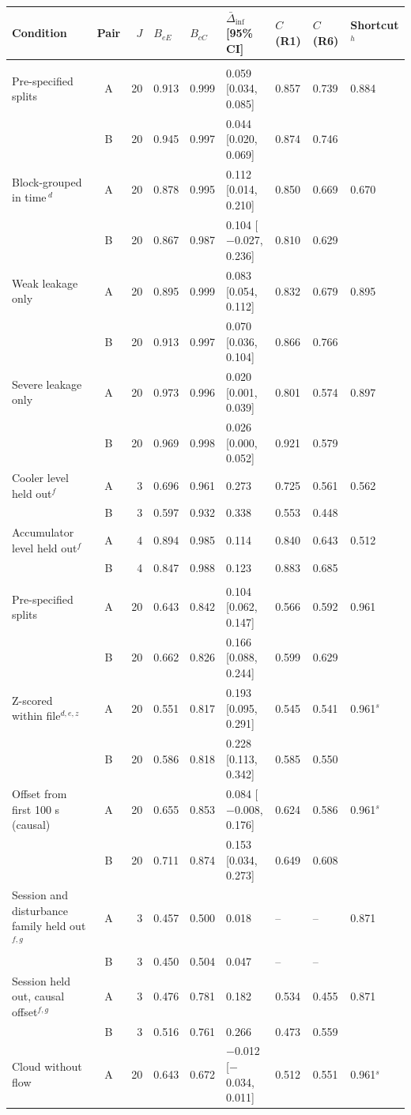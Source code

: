 \begin{tabular}{@{}>{\raggedright\arraybackslash}p{2.9cm} c r lll ll l@{}}
\toprule
Condition & Pair & $J$ & $B_{eE}$ & $B_{cC}$ & $\bar\Delta_{\mathrm{inf}}$ [95\% CI] & $C$(R1) & $C$(R6) & Shortcut$^{h}$ \\
\midrule
\multicolumn{9}{@{}l}{\textit{Hydraulic}} \\
Pre-specified splits & A & 20 & 0.913 & 0.999 & 0.059 [0.034, 0.085] & 0.857 & 0.739 & 0.884 \\
 & B & 20 & 0.945 & 0.997 & 0.044 [0.020, 0.069] & 0.874 & 0.746 &  \\
Block-grouped in time\,$^{d}$ & A & 20 & 0.878 & 0.995 & 0.112 [0.014, 0.210] & 0.850 & 0.669 & 0.670 \\
 & B & 20 & 0.867 & 0.987 & 0.104 [$-$0.027, 0.236] & 0.810 & 0.629 &  \\
Weak leakage only & A & 20 & 0.895 & 0.999 & 0.083 [0.054, 0.112] & 0.832 & 0.679 & 0.895 \\
 & B & 20 & 0.913 & 0.997 & 0.070 [0.036, 0.104] & 0.866 & 0.766 &  \\
Severe leakage only & A & 20 & 0.973 & 0.996 & 0.020 [0.001, 0.039] & 0.801 & 0.574 & 0.897 \\
 & B & 20 & 0.969 & 0.998 & 0.026 [0.000, 0.052] & 0.921 & 0.579 &  \\
Cooler level held out$^{f}$ & A & 3 & 0.696 & 0.961 & 0.273 & 0.725 & 0.561 & 0.562 \\
 & B & 3 & 0.597 & 0.932 & 0.338 & 0.553 & 0.448 &  \\
Accumulator level held out$^{f}$ & A & 4 & 0.894 & 0.985 & 0.114 & 0.840 & 0.643 & 0.512 \\
 & B & 4 & 0.847 & 0.988 & 0.123 & 0.883 & 0.685 &  \\
\multicolumn{9}{@{}l}{\textit{SKAB}} \\
Pre-specified splits & A & 20 & 0.643 & 0.842 & 0.104 [0.062, 0.147] & 0.566 & 0.592 & 0.961 \\
 & B & 20 & 0.662 & 0.826 & 0.166 [0.088, 0.244] & 0.599 & 0.629 &  \\
Z-scored within file$^{d,e,z}$ & A & 20 & 0.551 & 0.817 & 0.193 [0.095, 0.291] & 0.545 & 0.541 & 0.961$^{s}$ \\
 & B & 20 & 0.586 & 0.818 & 0.228 [0.113, 0.342] & 0.585 & 0.550 &  \\
Offset from first 100 s (causal) & A & 20 & 0.655 & 0.853 & 0.084 [$-$0.008, 0.176] & 0.624 & 0.586 & 0.961$^{s}$ \\
 & B & 20 & 0.711 & 0.874 & 0.153 [0.034, 0.273] & 0.649 & 0.608 &  \\
Session and disturbance family held out$^{f,g}$ & A & 3 & 0.457 & 0.500 & 0.018 & -- & -- & 0.871 \\
 & B & 3 & 0.450 & 0.504 & 0.047 & -- & -- &  \\
Session held out, causal offset$^{f,g}$ & A & 3 & 0.476 & 0.781 & 0.182 & 0.534 & 0.455 & 0.871 \\
 & B & 3 & 0.516 & 0.761 & 0.266 & 0.473 & 0.559 &  \\
Cloud without flow & A & 20 & 0.643 & 0.672 & $-$0.012 [$-$0.034, 0.011] & 0.512 & 0.551 & 0.961$^{s}$ \\
\bottomrule
\end{tabular}
